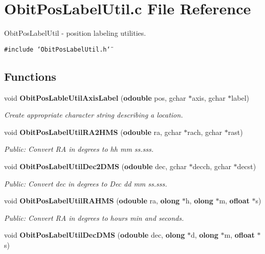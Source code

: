 \section{Obit\-Pos\-Label\-Util.c File Reference}
\label{ObitPosLabelUtil_8c}
Obit\-Pos\-Label\-Util - position labeling utilities. 

{\tt \#include \char`\"{}Obit\-Pos\-Label\-Util.h\char`\"{}}\par
\subsection*{Functions}
\begin{CompactItemize}
\item 
void {\bf Obit\-Pos\-Lable\-Util\-Axis\-Label} ({\bf odouble} pos, gchar $\ast$axis, gchar $\ast$label)
\begin{CompactList}\small\item\em Create appropriate character string describing a location. \item\end{CompactList}\item 
void {\bf Obit\-Pos\-Label\-Util\-RA2HMS} ({\bf odouble} ra, gchar $\ast$rach, gchar $\ast$rast)
\begin{CompactList}\small\item\em Public: Convert RA in degrees to hh mm ss.sss. \item\end{CompactList}\item 
void {\bf Obit\-Pos\-Label\-Util\-Dec2DMS} ({\bf odouble} dec, gchar $\ast$decch, gchar $\ast$decst)
\begin{CompactList}\small\item\em Public: Convert dec in degrees to Dec dd mm ss.sss. \item\end{CompactList}\item 
void {\bf Obit\-Pos\-Label\-Util\-RAHMS} ({\bf odouble} ra, {\bf olong} $\ast$h, {\bf olong} $\ast$m, {\bf ofloat} $\ast$s)
\begin{CompactList}\small\item\em Public: Convert RA in degrees to hours min and seconds. \item\end{CompactList}\item 
void {\bf Obit\-Pos\-Label\-Util\-Dec\-DMS} ({\bf odouble} dec, {\bf olong} $\ast$d, {\bf olong} $\ast$m, {\bf ofloat} $\ast$s)

\end{CompactItemize}
